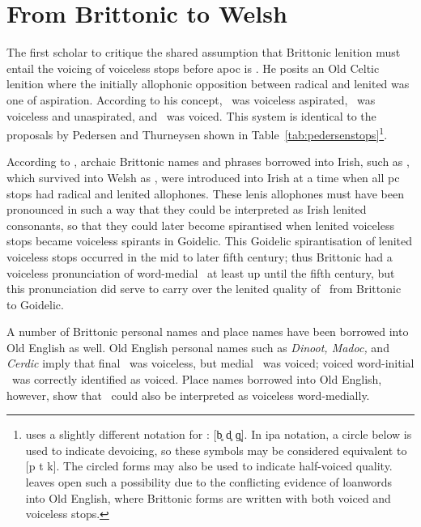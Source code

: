\section{From Brittonic to Welsh}
\label{sec:from-brittonic-welsh}
The first scholar to critique the shared assumption that Brittonic lenition must entail the voicing of voiceless stops before \gls{apoc} is \textcite{koch_*cothairche_1990}. He posits an Old Celtic lenition where the initially allophonic opposition between radical and lenited was one of aspiration.  According to his concept, \xT\ was voiceless aspirated, \lT\ was voiceless and unaspirated, and \xD\ was voiced. This system is identical to the proposals by Pedersen and Thurneysen shown in Table~\ref{tab:pedersenstops}\footnote{\Textcite{koch_*cothairche_1990} uses a slightly different notation for \lT: [b̥ d̥ ɡ̥]. In \gls{ipa} notation, a circle below is used to indicate devoicing, so these symbols may be considered equivalent to [p t k]. The circled forms may also be used to indicate half-voiced quality. \Textcite[§~29]{koch_*cothairche_1990} leaves open such a possibility due to the conflicting evidence of loanwords into Old English, where Brittonic forms are written with both voiced and voiceless stops.}.

According to \textcite{koch_*cothairche_1990}, archaic Brittonic names and phrases borrowed into Irish, such as , which survived into Welsh as , were introduced into Irish at a time when all \gls{pc} stops had radical and lenited allophones. These lenis allophones must have been pronounced in such a way that they could be interpreted as Irish lenited consonants, so that they could later become spirantised when lenited voiceless stops became voiceless spirants in Goidelic. This Goidelic spirantisation of lenited voiceless stops occurred in the mid to later fifth century; thus Brittonic had a voiceless pronunciation of word-medial \lT\ at least up until the fifth century, but this pronunciation did serve to carry over the lenited quality of \lT\ from Brittonic to Goidelic.

A number of Brittonic personal names and place names have been borrowed into Old English as well. Old English personal names such as \textit{Dinoot, Madoc,} and \textit{Cerdic} imply that final \lT\ was voiceless, but medial \lT\ was voiced; voiced word-initial \xD\ was correctly identified as voiced. Place names borrowed into Old English, however, show that \lT\ could also be interpreted as voiceless word-medially.

